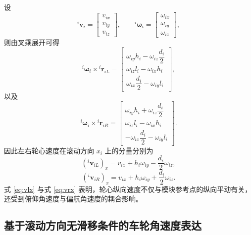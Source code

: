 设
\begin{equation}
{}^{i}\mathbf v_i=
\begin{bmatrix}
v_{ix}\\
v_{iy}\\
v_{iz}
\end{bmatrix},
\qquad
{}^{i}\boldsymbol\omega_i=
\begin{bmatrix}
\omega_{ix}\\
\omega_{iy}\\
\omega_{iz}
\end{bmatrix},
\end{equation}
则由叉乘展开可得
\begin{equation}
{}^{i}\boldsymbol\omega_i\times {}^{i}\mathbf r_{iL}
=
\begin{bmatrix}
\omega_{iy}h_i-\omega_{iz}\dfrac{d_i}{2}\\[4pt]
\omega_{iz}l_i-\omega_{ix}h_i\\[4pt]
\omega_{ix}\dfrac{d_i}{2}-\omega_{iy}l_i
\end{bmatrix},
\end{equation}
以及
\begin{equation}
{}^{i}\boldsymbol\omega_i\times {}^{i}\mathbf r_{iR}
=
\begin{bmatrix}
\omega_{iy}h_i+\omega_{iz}\dfrac{d_i}{2}\\[4pt]
\omega_{iz}l_i-\omega_{ix}h_i\\[4pt]
-\omega_{ix}\dfrac{d_i}{2}-\omega_{iy}l_i
\end{bmatrix}.
\end{equation}
因此左右轮心速度在滚动方向 $x_i$ 上的分量分别为
\begin{equation}
({}^{i}\mathbf v_{iL})_x
=
v_{ix}
+
h_i\omega_{iy}
-\frac{d_i}{2}\omega_{iz},
\label{eq:vlx}
\end{equation}
\begin{equation}
({}^{i}\mathbf v_{iR})_x
=
v_{ix}
+
h_i\omega_{iy}
+
\frac{d_i}{2}\omega_{iz}.
\label{eq:vrx}
\end{equation}
式 \eqref{eq:vlx} 与式 \eqref{eq:vrx} 表明，轮心纵向速度不仅与模块参考点的纵向平动有关，还受到俯仰角速度与偏航角速度的耦合影响。

\subsection{基于滚动方向无滑移条件的车轮角速度表达}

